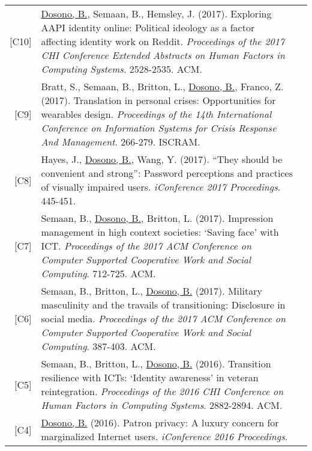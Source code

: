 \documentclass[11pt]{article}
\begin{document}
{{\begin{longtable}{Rp{0.75in}p{5.0in}}
\footnotesize{[C10]} & \href{https://dl.acm.org/authorize?N41342}{{Dosono, B.}}, Semaan, B., Hemsley, J. (2017). Exploring AAPI identity online: Political ideology as a factor affecting identity work on Reddit. \textit{Proceedings of the 2017 CHI Conference Extended Abstracts on Human Factors in Computing Systems}. 2528-2535. ACM.\\

\footnotesize{[C9]} & Bratt, S., Semaan, B., Britton, L., \href{http://idl.iscram.org/files/sarahbratt/2017/2017_SarahBratt_etal2017.pdf}{{Dosono, B.}}, Franco, Z. (2017). Translation in personal crises: Opportunities for wearables design. \textit{Proceedings of the 14th International Conference on Information Systems for Crisis Response And Management}. 266-279. ISCRAM.\\

\footnotesize{[C8]} & Hayes, J., \href{http://hdl.handle.net/2142/96755}{{Dosono, B.}}, Wang, Y. (2017). ``They should be convenient and strong'': Password perceptions and practices of visually impaired users. \textit{iConference 2017 Proceedings}. 445-451.\\

\footnotesize{[C7]} & Semaan, B., \href{https://dl.acm.org/authorize?N41343}{{Dosono, B.}}, Britton, L. (2017). Impression management in high context societies: `Saving face' with ICT. \textit{Proceedings of the 2017 ACM Conference on Computer Supported Cooperative Work and Social Computing}. 712-725. ACM.\\

\footnotesize{[C6]} & Semaan, B., Britton, L., \href{https://dl.acm.org/authorize?N41344}{{Dosono, B.}} (2017). Military masculinity and the travails of transitioning: Disclosure in social media. \textit{Proceedings of the 2017 ACM Conference on Computer Supported Cooperative Work and Social Computing}. 387-403. ACM.\\

\footnotesize{[C5]} & Semaan, B., Britton, L., \href{https://dl.acm.org/authorize?N41455}{{Dosono, B.}} (2016). Transition resilience with ICTs: `Identity awareness' in veteran reintegration. \textit{Proceedings of the 2016 CHI Conference on Human Factors in Computing Systems}. 2882-2894. ACM.\\

\footnotesize{[C4]} & \href{https://doi.org/10.9776/16285}{{Dosono, B.}} (2016). Patron privacy: A luxury concern for marginalized Internet users. \textit{iConference 2016 Proceedings}.\\


\end{longtable}}}
\end{document}
